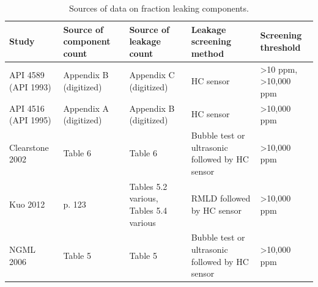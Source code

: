 \documentclass[11pt]{report}
\begin{document}
{{{{\begin{landscape}
\begin{table}[]
\begin{scriptsize}
\caption{Sources of data on fraction leaking components.}
\label{tab:fraction_leaking_sources}
\begin{tabular*}{1\columnwidth}{lllll}
\toprule
Study               & Source of component count & Source of leakage count                & Leakage screening method                        & Screening threshold                        \\
\midrule
API 4589 (API 1993) & Appendix B (digitized)    & Appendix C (digitized)                 & HC sensor                                       & \textgreater{}10 ppm, \textgreater 10,000 ppm \\
API 4516 (API 1995) & Appendix A (digitized)    & Appendix B (digitized)                 & HC sensor                                       & \textgreater 10,000 ppm                       \\
Clearstone 2002     & Table 6                   & Table 6                                & Bubble test or ultrasonic followed by HC sensor & \textgreater{}10,000 ppm                      \\
Kuo 2012            & p. 123                    & Tables 5.2 various, Tables 5.4 various & RMLD followed by HC sensor                      & \textgreater{}10,000 ppm                      \\
NGML 2006           & Table 5                   & Table 5                                & Bubble test or ultrasonic followed by HC sensor & \textgreater{}10,000 ppm      \\
\bottomrule               
\end{tabular*}
\end{scriptsize}
\end{table}



\end{landscape}}}}}
\end{document}
